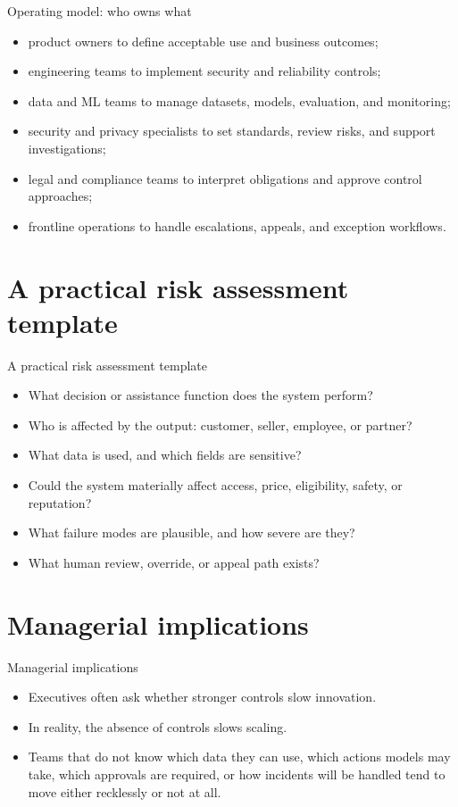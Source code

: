 \documentclass[aspectratio=169]{beamer}
\begin{document}
\begin{frame}{Operating model: who owns what}
  \begin{itemize}
    \item product owners to define acceptable use and business outcomes;
    \item engineering teams to implement security and reliability controls;
    \item data and ML teams to manage datasets, models, evaluation, and monitoring;
    \item security and privacy specialists to set standards, review risks, and support investigations;
    \item legal and compliance teams to interpret obligations and approve control approaches;
    \item frontline operations to handle escalations, appeals, and exception workflows.
  \end{itemize}
\end{frame}

\section{A practical risk assessment template}

\begin{frame}{A practical risk assessment template}
  \begin{itemize}
    \item What decision or assistance function does the system perform?
    \item Who is affected by the output: customer, seller, employee, or partner?
    \item What data is used, and which fields are sensitive?
    \item Could the system materially affect access, price, eligibility, safety, or reputation?
    \item What failure modes are plausible, and how severe are they?
    \item What human review, override, or appeal path exists?
  \end{itemize}
\end{frame}

\section{Managerial implications}

\begin{frame}{Managerial implications}
  \begin{itemize}
    \item Executives often ask whether stronger controls slow innovation.
    \item In reality, the absence of controls slows scaling.
    \item Teams that do not know which data they can use, which actions models may take, which approvals are required, or how incidents will be handled tend to move either recklessly or not at all.
  \end{itemize}
\end{frame}
\end{document}
